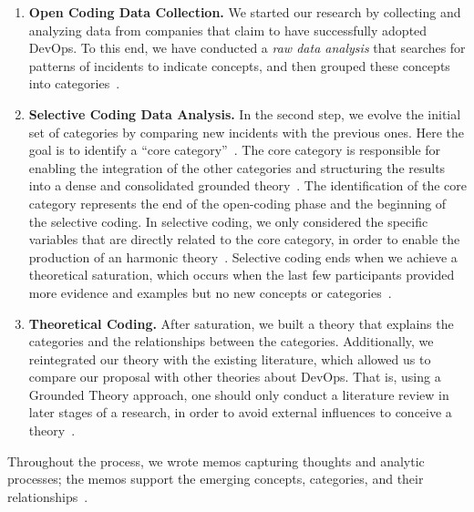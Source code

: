 \begin{enumerate}[label=(\Alph*)]
\item {\bf Open Coding Data Collection.} We started our research
  by collecting and analyzing data from companies that claim to have
  successfully adopted DevOps.
  To this end, we have conducted a \emph{raw data analysis} that searches for patterns of
  incidents to indicate concepts,  and then grouped these concepts into
  categories~\cite{stol2016grounded}.

\item {\bf Selective Coding Data Analysis.} In the second step, we evolve
  the initial set of
  categories by comparing new incidents with the previous ones. Here the goal is
  to identify a ``core category''~\cite{stol2016grounded}.
  The core category is responsible for enabling the integration of the other
  categories and structuring the results into a dense and consolidated grounded
  theory~\cite{jantunen2014using}. The identification of the core category
  represents the end of the open-coding phase and the beginning of the selective coding.
  In selective coding, we only considered the specific variables that are directly
  related to the core category, in order to enable the production of an harmonic
  theory~\cite{coleman2007using,hoda2011impact}. Selective coding ends when we
  achieve a theoretical saturation, which occurs when the last few
  participants provided more evidence and examples but no new concepts or
  categories~\cite{glase1967discovery}.

\item {\bf Theoretical Coding.} After saturation, we built a theory that
explains the categories and the relationships between the categories.
Additionally, we reintegrated our theory with the existing literature, which allowed us to compare our proposal
 with other theories about DevOps. That is, using a Grounded Theory approach,
 one should only conduct a literature review in later stages of a research,
in order to avoid external influences to conceive a theory~\cite{adolph2012reconciling}.

\end{enumerate}

Throughout the process, we wrote memos capturing thoughts and analytic
processes; the memos support the emerging concepts, categories, and their
relationships~\cite{adolph2012reconciling}.

